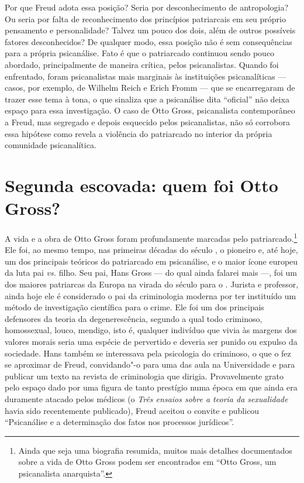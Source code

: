 Por que Freud adota essa posição? Seria por desconhecimento de
antropologia? Ou seria por falta de reconhecimento dos princípios
patriarcais em seu próprio pensamento e personalidade? Talvez um pouco
dos dois, além de outros possíveis fatores desconhecidos? De qualquer
modo, essa posição não é sem consequências para a própria psicanálise.
Fato é que o patriarcado continuou sendo pouco abordado, principalmente
de maneira crítica, pelos psicanalistas. Quando foi enfrentado, foram
psicanalistas mais marginais às instituições psicanalíticas --- casos,
por exemplo, de Wilhelm Reich e Erich Fromm --- que se encarregaram de
trazer esse tema à tona, o que sinaliza que a psicanálise dita
``oficial'' não deixa espaço para essa investigação. O caso de Otto
Gross, psicanalista contemporâneo a Freud, mas segregado e depois
esquecido pelos psicanalistas, não só corrobora essa hipótese como
revela a violência do patriarcado no interior da própria comunidade
psicanalítica.

\section{Segunda escovada: quem foi Otto Gross? }

A vida e a obra de Otto Gross foram profundamente marcadas pelo
patriarcado.\footnote{Ainda que seja uma biografia resumida, muitos mais
  detalhes documentados sobre a vida de Otto Gross podem ser encontrados
  em ``Otto Gross, um psicanalista anarquista''.} Ele foi, ao mesmo
tempo, nas primeiras décadas do século , o pioneiro e, até hoje, um
dos principais teóricos do patriarcado em psicanálise, e o maior ícone
europeu da luta pai \emph{vs.} filho. Seu pai, Hans Gross --- do qual
ainda falarei mais ---, foi um dos maiores patriarcas da Europa na virada
do século  para o . Jurista e professor, ainda hoje ele é
considerado o pai da criminologia moderna por ter instituído um método
de investigação científica para o crime. Ele foi um dos principais
defensores da teoria da degenerescência, segundo a qual todo criminoso,
homossexual, louco, mendigo, isto é, qualquer indivíduo que vivia às
margens dos valores morais seria uma espécie de pervertido e deveria ser
punido ou expulso da sociedade. Hans também se interessava pela
psicologia do criminoso, o que o fez se aproximar de Freud, convidando"-o
para uma das aula na Universidade e para publicar um texto na revista de
criminologia que dirigia. Provavelmente grato pelo espaço dado por uma
figura de tanto prestígio numa época em que ainda era duramente atacado
pelos médicos (o \emph{Três ensaios sobre a teoria da sexualidade} havia
sido recentemente publicado), Freud aceitou o convite e publicou
``Psicanálise e a determinação dos fatos nos processos jurídicos''.

